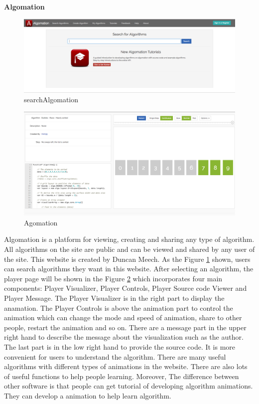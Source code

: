 \documentclass[paper=a4, fontsize=11pt,twoside]{scrartcl}		%
\begin{document}
\textbf{Algomation}\\

\begin{figure}[htbp]
\centering
\includegraphics[width=.8\textwidth]{searchAlgomation.png}
\caption{searchAlgomation}
\label{searchAlgomation}
\end{figure}

\begin{figure}[htbp]
\centering
\includegraphics[width=.8\textwidth]{Agomation.png}
\caption{Agomation}
\label{Agomation}
\end{figure}


Algomation is a platform for viewing, creating and sharing any type of algorithm. All algorithms on the site are public and can be viewed and shared by any user of the site. This website is created by Duncan Meech. As the Figure \ref{searchAlgomation} shown, users can search algorithms they want in this website. After selecting an algorithm, the player page will be shown in the Figure \ref{Agomation} which incorporates four main components: Player Visualizer, Player Controls, Player Source code Viewer and Player Message. The Player Visualizer is in the right part to display the anamation. The Player Controls is above the animation part to control the animation which can change the mode and speed of animation, share to other people, restart the animation and so on. There are a message part in the upper right hand to describe the message about the visualization such as the author. The last part is in the low right hand to provide the source code. It is more convenient for users to understand the algorithm. There are many useful algorithms with different types of animations in the website. There are also lots of useful functions to help people learning. Moreover, The difference between other software is that people can get tutorial of developing algorithm animations. They can develop a animation to help learn algorithm. \\
\end{document}
